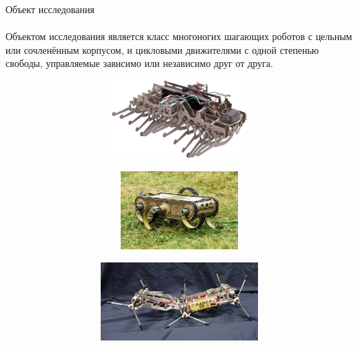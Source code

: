 \documentclass[aspectratio=169,xcolor=table]{beamer}
\begin{document}
\begin{frame}[t]{Объект исследования}
\framesubtitle{}
Объектом исследования является класс многоногих шагающих роботов с цельным или сочленённым корпусом, и цикловыми движителями с одной степенью свободы, управляемые зависимо или независимо друг от друга.

\begin{figure}[H]
    \begin{subfigure}{0.32\textwidth}
        \centering\includegraphics[height=3cm,width=1\textwidth,keepaspectratio]{from_master/gakken.jpg}
        \label{fig:from_master/gakken.jpg}
    \end{subfigure}
    \begin{subfigure}{0.32\textwidth}
        \centering\includegraphics[height=3cm,width=1\textwidth,keepaspectratio]{from_master/rhex.jpg}
        \label{fig:from_master/rhex.jpg}
    \end{subfigure}
    \begin{subfigure}{0.32\textwidth}
        \centering\includegraphics[height=3cm,width=1\textwidth,keepaspectratio]{from_master/whegs2.jpg}
        \label{fig:from_master/whegs2.jpg}
    \end{subfigure}
\end{figure}
\end{frame}
\end{document}
